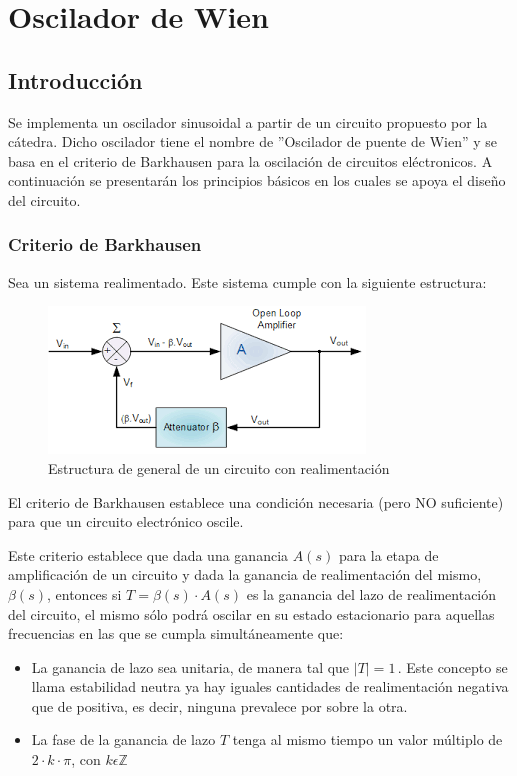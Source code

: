 \documentclass[../../tc_tp6_main.tex]{subfiles}
\begin{document}
\chapter{Oscilador de Wien}

\section{Introducción}

Se implementa un oscilador sinusoidal a partir de un circuito propuesto por la cátedra. Dicho oscilador tiene el nombre de ''Oscilador de puente de Wien'' y se basa en el criterio de Barkhausen para la oscilación de circuitos eléctronicos. A continuación se presentarán los principios básicos en los cuales se apoya el diseño del circuito. 
\subsection{Criterio de Barkhausen}

Sea un sistema realimentado. Este sistema cumple con la siguiente estructura: \par

\begin{figure}[H]	
	\centering
	\includegraphics[scale=2]{imagenes/feedback_estructura.png}
	\caption{Estructura de general de un circuito con realimentación}
	\label{fig:ej1_feedback_estructura}
\end{figure}
El criterio de Barkhausen establece una condición necesaria (pero NO suficiente) para que  un circuito electrónico oscile.\par
Este criterio establece que dada una ganancia $A(s)$ para la etapa de amplificación de un circuito y dada la ganancia de realimentación del mismo, $\beta (s)$, entonces si $T = \beta (s)\cdot A(s)$ es la ganancia del lazo de realimentación del circuito, el mismo sólo podrá oscilar en su estado estacionario para aquellas frecuencias en las que se cumpla simultáneamente que: \par

\begin{itemize}
\item La ganancia de lazo sea unitaria, de manera tal que ${\displaystyle |T|=1\,}$. Este concepto se llama estabilidad neutra ya hay iguales cantidades de realimentación negativa que de positiva, es decir, ninguna prevalece por sobre la otra.
\item La fase de la ganancia de lazo $T$ tenga al mismo tiempo un valor múltiplo de $2\cdot k \cdot \pi$, con $k\epsilon \mathbb{Z}$
\end{itemize}
\end{document}
